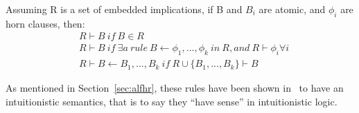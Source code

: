 Assuming R is a set of embedded implications, if B and $B_i$ are atomic, and $\phi_i$
are horn clauses, then:
\begin{equation}
  \begin{split}
    &R \vdash B\ if\ B \in R \\
    &R \vdash B\ if\ \exists a\ rule\ B \leftarrow \phi_1,...,\phi_k\ in\ R, and\ R \vdash \phi_i \forall i\\
    &R \vdash B \leftarrow B_1,..., B_k\ if\ R \cup \{B_1,...,B_k\} \vdash B
  \end{split}
\end{equation}


As mentioned in Section~\ref{sec:alfhr}, these rules have been shown in~\cite{Bonner88alogic}
to have an intuitionistic semantics, that is to say they ``have sense'' in intuitionistic logic.
